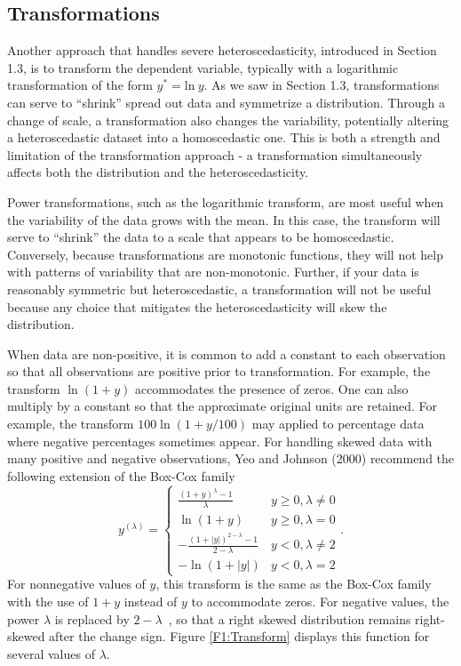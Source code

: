\subsection{Transformations}\label{S5:Transformations}

Another approach that handles severe heteroscedasticity, introduced
in Section 1.3, is to transform the dependent variable, typically
with a logarithmic transformation of the form $y^{\ast} =
\mathrm{ln~}y$. As we saw in Section 1.3, transformations can serve
to ``shrink'' spread out data and symmetrize a distribution. Through
a change of scale, a transformation also changes the variability,
potentially altering a heteroscedastic dataset into a homoscedastic
one. This is both a strength and limitation of the transformation
approach - a transformation simultaneously affects both the
distribution and the heteroscedasticity.


Power transformations, such as the logarithmic transform, are most
useful when the variability of the data grows with the mean. In this
case, the transform will serve to ``shrink'' the data to a scale
that appears to be homoscedastic. Conversely, because
transformations are monotonic functions, they will not help with
patterns of variability that are non-monotonic. Further, if your
data is reasonably symmetric but heteroscedastic, a transformation
will not be useful because any choice that mitigates the
heteroscedasticity will skew the distribution.

When data are non-positive, it is common to add a constant to each
observation so that all observations are positive prior to
transformation. For example, the transform $\ln (1+y)$ accommodates
the presence of zeros. One can also multiply by a constant so that
the approximate original units are retained. For example, the
transform $100\ln (1+y/100)$ may applied to percentage data where
negative percentages sometimes appear. For handling skewed data with
many positive and negative observations, Yeo and Johnson (2000)
recommend the following extension of the Box-Cox family
\begin{equation*}
y^{(\lambda )}=\left\{
\begin{array}{ll}
\frac{(1+y)^{\lambda }-1}{\lambda } & y\geq 0,\lambda \neq 0 \\
\ln (1+y) & y\geq 0,\lambda =0 \\
-\frac{(1+|y|)^{2-\lambda }-1}{2-\lambda } & y<0,\lambda \neq 2 \\
-\ln (1+|y|) & y<0,\lambda =2%
\end{array}%
\right. .
\end{equation*}%
For nonnegative values of $y$, this transform is the same as the
Box-Cox family with the use of $1+y$ instead of $y$ to accommodate
zeros. For negative values, the power $\lambda $ is replaced by
$2-\lambda $\ , so that a right skewed distribution remains
right-skewed after the change sign. Figure \ref{F1:Transform}
displays this function for several values of $\lambda $.

